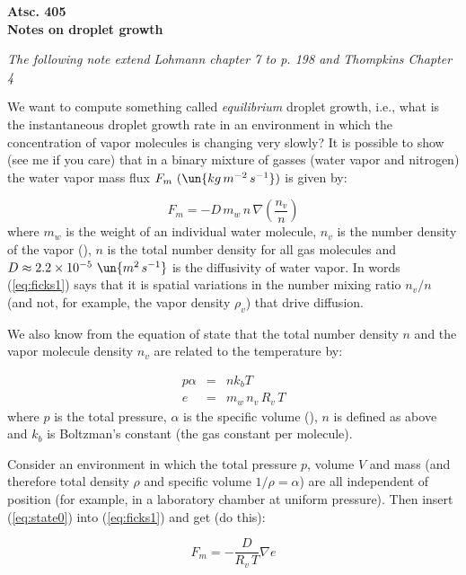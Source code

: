 \documentclass[12pt]{article}
\begin{document}
\begin{center}
{\bf
Atsc. 405\\
Notes on droplet growth\\
 }
\end{center}


\textit{The following note extend Lohmann chapter 7 to p. 198 and Thompkins Chapter 4}


We want to compute something called \textit{equilibrium} droplet
growth, i.e., what is the instantaneous droplet growth rate in an
environment in which the concentration of vapor molecules is changing
very slowly?  It is possible to show (see me if you care) that in a
binary mixture of gasses (water vapor and nitrogen) the water vapor
mass flux $F_m\ (\un{kg\,m^{-2}\,s^{-1}})$ is given by:

\begin{equation}
  \label{eq:ficks1}
  F_m = -D\, m_w\, n\, \nabla \left (\frac{n_v}{n} \right )
\end{equation}
where $m_w$ is the weight of an individual water molecule, $n_v$ is
the number density of the vapor (),
$n$ is the total number density for all gas molecules
and  $D \approx
2.2 \times 10^{-5}~\un{m^2\,s^{-1}}$ is the diffusivity of water vapor.
In words (\ref{eq:ficks1}) says that it is spatial variations in
the number mixing ratio $n_v/n$ (and not, for example, the vapor
density $\rho_v$) that drive diffusion.

We also know from the equation of state that the total number density
$n$ and the vapor molecule density $n_v$ are related to the temperature by:

\begin{eqnarray}
  \label{eq:state0}
  p \alpha &=& n k_b T\nonumber\\
  e &=& m_w\, n_v\, R_v\, T
\end{eqnarray}
where $p$  is the total pressure, $\alpha$ is the specific volume (),
$n$ is defined as above and $k_b$ is Boltzman's constant (the gas constant per molecule).

Consider an environment in which the total pressure $p$, volume $V$
and mass (and therefore total density $\rho$ and specific volume
$1/\rho = \alpha$) are all independent of position (for example, in a
laboratory chamber at uniform pressure).  Then insert (\ref{eq:state0}) into
(\ref{eq:ficks1}) and get (do this):

\begin{equation}
  \label{eq:goodeqn}
  F_m = -\frac{D}{R_v\,T} \nabla e
\end{equation}
\end{document}
